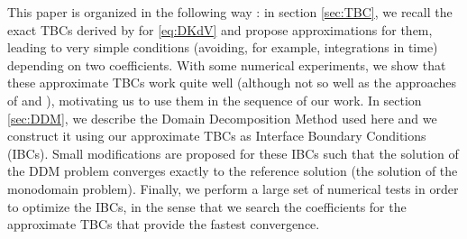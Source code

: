 \indent This paper is organized in the following way : in section \ref{sec:TBC}, we recall the exact TBCs derived by \cite{zheng2008} for \eqref{eq:DKdV} and propose approximations for them, leading to very simple conditions (avoiding, for example, integrations in time) depending on two coefficients. With some numerical experiments, we show that these approximate TBCs work quite well (although not so well as the approaches of \cite{zheng2008} and \cite{besse2015}), motivating us to use them in the sequence of our work. In section \ref{sec:DDM}, we describe the Domain Decomposition Method used here and we construct it using our approximate TBCs as Interface Boundary Conditions (IBCs). Small modifications are proposed for these IBCs such that the solution of the DDM problem converges exactly to the reference solution (the solution of the monodomain problem). Finally, we perform a large set of numerical tests in order to optimize the IBCs, in the sense that we search the coefficients for the approximate TBCs that provide the fastest convergence.